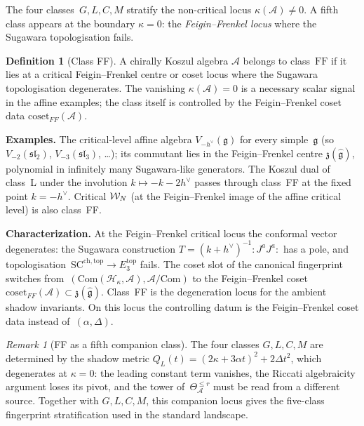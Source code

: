 \documentclass[11pt]{article}
\theoremstyle{plain}
\theoremstyle{definition}
\newtheorem{definition}[theorem]{Definition}
\theoremstyle{remark}
\newtheorem{remark}[theorem]{Remark}
\providecommand{\fg}{\mathfrak{g}}
\providecommand{\cA}{\mathcal{A}}
\providecommand{\cH}{\mathcal{H}}
\begin{document}
The four classes~$G, L, C, M$ stratify the non-critical locus
$\kappa(\cA) \neq 0$. A fifth class appears at the boundary
$\kappa = 0$: the \emph{Feigin--Frenkel locus} where the Sugawara
topologisation fails.

\begin{definition}[Class FF]\label{def:class-FF}
A chirally Koszul algebra $\cA$ belongs to class~$\mathrm{FF}$ if
it lies at a critical Feigin--Frenkel centre or coset locus where
the Sugawara topologisation degenerates. The vanishing
$\kappa(\cA)=0$ is a necessary scalar signal in the affine examples;
the class itself is controlled by the Feigin--Frenkel coset data
$\mathrm{coset}_{FF}(\cA)$.
\end{definition}

\noindent\textbf{Examples.}
The critical-level affine algebra $V_{-h^\vee}(\fg)$ for every
simple~$\fg$ (so $V_{-2}(\mathfrak{sl}_2)$, $V_{-3}(\mathfrak{sl}_3)$,
\dots); its commutant lies in the Feigin--Frenkel centre
$\mathfrak{z}(\widehat{\fg})$, polynomial in infinitely many
Sugawara-like generators. The Koszul dual of class~L under the
involution $k \mapsto -k - 2h^\vee$ passes through class~FF at the
fixed point $k = -h^\vee$. Critical $\mathcal{W}_N$ (at the Feigin--Frenkel
image of the affine critical level) is also class~FF.

\noindent\textbf{Characterization.}
At the Feigin--Frenkel critical locus the conformal vector degenerates:
the Sugawara
construction $T = (k + h^\vee)^{-1} :J^a J^a:$ has a pole, and
topologisation~$\mathrm{SC}^{\mathrm{ch,top}} \to E_3^{\mathrm{top}}$
fails. The coset slot of the canonical fingerprint
switches from~$(\mathrm{Com}(\cH_\kappa, \cA), \cA/\mathrm{Com})$
to the Feigin--Frenkel coset
$\mathrm{coset}_{FF}(\cA) \subset \mathfrak{z}(\widehat{\fg})$.
Class~FF is the degeneration locus for the ambient shadow invariants.
On this locus the controlling datum is the Feigin--Frenkel coset data
instead of~$(\alpha, \Delta)$.

\begin{remark}[FF as a fifth companion class]
\label{rem:FF-not-refinement}
The four classes $G, L, C, M$ are determined by the shadow metric
$Q_L(t) = (2\kappa + 3\alpha t)^2 + 2\Delta t^2$, which degenerates
at $\kappa = 0$: the leading constant term vanishes, the Riccati
algebraicity argument loses its pivot, and the tower
of~$\Theta_\cA^{\leq r}$ must be read from a different source.
Together with $G,L,C,M$, this companion locus gives the
five-class fingerprint stratification used in the standard landscape.
\end{remark}
\end{document}
